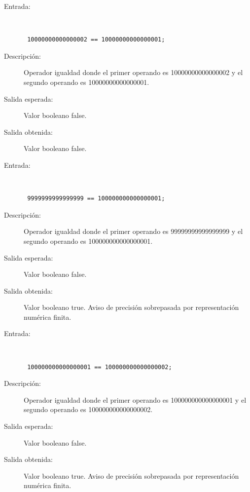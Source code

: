 \begin{framed}
	\begin{description}
		\item [Entrada:] \hfill \\
\begin{lstlisting}
 10000000000000002 == 10000000000000001;
\end{lstlisting}
		\item [Descripción:] Operador igualdad donde el primer operando es 10000000000000002 y el segundo operando es  10000000000000001.
		\item [Salida esperada:] Valor booleano false.
		\item [Salida obtenida:] Valor booleano false.
	\end{description}
\end{framed}

\begin{framed}
	\begin{description}
		\item [Entrada:] \hfill \\
\begin{lstlisting}
 9999999999999999 == 100000000000000001;
\end{lstlisting}
		\item [Descripción:] Operador igualdad donde el primer operando es 99999999999999999 y el segundo operando es  100000000000000001.
		\item [Salida esperada:] Valor booleano false.
		\item [Salida obtenida:] Valor booleano true.  Aviso de precisión sobrepasada por representación numérica finita.
	\end{description}
\end{framed}

\begin{framed}
	\begin{description}
		\item [Entrada:] \hfill \\
\begin{lstlisting}
 100000000000000001 == 100000000000000002;
\end{lstlisting}
		\item [Descripción:] Operador igualdad donde el primer operando es 100000000000000001 y el segundo operando es  100000000000000002.
		\item [Salida esperada:] Valor booleano false.
		\item [Salida obtenida:] Valor booleano true.  Aviso de precisión sobrepasada por representación numérica finita.
	\end{description}
\end{framed}

